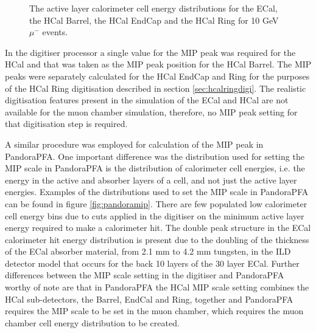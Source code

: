 \begin{figure}
\caption[The active layer calorimeter cell energy distributions for \protect{} the ECal, \protect{} the HCal Barrel, \protect{} the HCal EndCap and \protect{} the HCal Ring for 10 GeV $\mu^{-}$ events.]{The active layer calorimeter cell energy distributions for \protect{} the ECal, \protect{} the HCal Barrel, \protect{} the HCal EndCap and \protect{} the HCal Ring for 10 GeV $\mu^{-}$ events.}
\label{fig:digitisermip}
\end{figure}

In the digitiser processor a single value for the MIP peak was required for the HCal and that was taken as the MIP peak position for the HCal Barrel.  The MIP peaks were separately calculated for the HCal EndCap and Ring for the purposes of the HCal Ring digitisation described in section \ref{sec:hcalringdigi}.  The realistic digitisation features present in the simulation of the ECal and HCal are not available for the muon chamber simulation, therefore, no MIP peak setting for that digitisation step is required.

A similar procedure was employed for calculation of the MIP peak in PandoraPFA.  One important difference was the distribution used for setting the MIP scale in PandoraPFA is the distribution of calorimeter cell energies, i.e. the energy in the active and absorber layers of a cell, and not just the active layer energies.  Examples of the distributions used to set the MIP scale in PandoraPFA can be found in figure \ref{fig:pandoramip}.  There are few populated low calorimeter cell energy bins due to cuts applied in the digitiser on the minimum active layer energy required to make a calorimeter hit.  The double peak structure in the ECal calorimeter hit energy distribution is present due to the doubling of the thickness of the ECal absorber material, from 2.1 mm to 4.2 mm tungsten, in the ILD detector model that occurs for the back 10 layers of the 30 layer ECal.  Further differences between the MIP scale setting in the digitiser and PandoraPFA worthy of note are that in PandoraPFA the HCal MIP scale setting combines the HCal sub-detectors, the Barrel, EndCal and Ring, together and PandoraPFA requires the MIP scale to be set in the muon chamber, which requires the muon chamber cell energy distribution to be created.  

